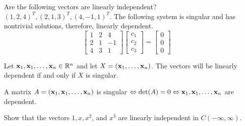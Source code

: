 \begin{example}
	Are the following vectors are linearly independent?   $(1, 2, 4)^T, (2, 1, 3)^T, (4, -1, 1)^T$.  The following system is singular and has nontrivial solutions, therefore, linearly dependent.
	\[  \begin{bmatrix}  1	& 2	& 4\\ 2 & 1  &  -1\\ 4  &  3  &  1   \end{bmatrix} \begin{bmatrix} c_1 \\ c_2  \\ c_3   \end{bmatrix}  = \begin{bmatrix}  0 \\ 0 \\  0  \end{bmatrix} \]
	
\end{example}








\begin{theorem}
	Let ${\bf x}_1, {\bf x}_1, \dots, {\bf x}_n \in \mathbb{R}^n$ and let $X = ({\bf x}_1, \dots, {\bf x}_n)$.  The vectors will be linearly dependent if and only if $X$ is singular.
	
	
\end{theorem}




 \begin{tcolorbox}[colback=yellow!20!,colframe=gray!15!]

A matrix $A=({\bf x}_1, {\bf x}_1, \dots, {\bf x}_n )$ is singular $\Leftrightarrow  \det(A) =0  \Leftrightarrow {\bf x}_1, {\bf x}_1, \dots, {\bf x}_n $ are  dependent.  

 \end{tcolorbox}

















\begin{example}
	Show that the vectors $1, x, x^2$, and $x^3$ are linearly independent in $C(-\infty, \infty)$.  
\end{example}









